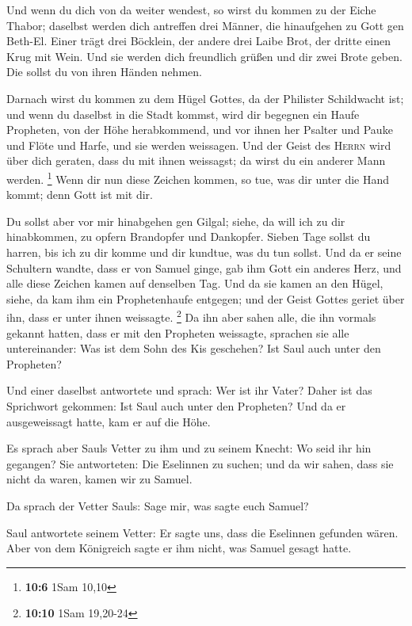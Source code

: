  Und wenn du dich von da weiter wendest, so wirst du
kommen zu der Eiche Thabor; daselbst werden dich antreffen drei Männer,
die hinaufgehen zu Gott gen Beth-El. Einer trägt drei Böcklein, der
andere drei Laibe Brot, der dritte einen Krug mit Wein. 
Und sie werden dich freundlich grüßen und dir zwei Brote geben. Die
sollst du von ihren Händen nehmen.

 Darnach wirst du kommen zu dem Hügel Gottes, da der
Philister Schildwacht ist; und wenn du daselbst in die Stadt kommst,
wird dir begegnen ein Haufe Propheten, von der Höhe herabkommend, und
vor ihnen her Psalter und Pauke und Flöte und Harfe, und sie werden
weissagen.  Und der Geist des \textsc{Herrn} wird über
dich geraten, dass du mit ihnen weissagst; da wirst du ein anderer Mann
werden. \footnote{\textbf{10:6} 1Sam 10,10}  Wenn dir nun
diese Zeichen kommen, so tue, was dir unter die Hand kommt; denn Gott
ist mit dir.

 Du sollst aber vor mir hinabgehen gen Gilgal; siehe, da
will ich zu dir hinabkommen, zu opfern Brandopfer und Dankopfer. Sieben
Tage sollst du harren, bis ich zu dir komme und dir kundtue, was du tun
sollst.  Und da er seine Schultern wandte, dass er von
Samuel ginge, gab ihm Gott ein anderes Herz, und alle diese Zeichen
kamen auf denselben Tag.  Und da sie kamen an den Hügel,
siehe, da kam ihm ein Prophetenhaufe entgegen; und der Geist Gottes
geriet über ihn, dass er unter ihnen weissagte. \footnote{\textbf{10:10}
  1Sam 19,20-24}  Da ihn aber sahen alle, die ihn vormals
gekannt hatten, dass er mit den Propheten weissagte, sprachen sie alle
untereinander: Was ist dem Sohn des Kis geschehen? Ist Saul auch unter
den Propheten?

 Und einer daselbst antwortete und sprach: Wer ist ihr
Vater? Daher ist das Sprichwort gekommen: Ist Saul auch unter den
Propheten?  Und da er ausgeweissagt hatte, kam er auf die
Höhe.

 Es sprach aber Sauls Vetter zu ihm und zu seinem Knecht:
Wo seid ihr hin gegangen? Sie antworteten: Die Eselinnen zu suchen; und
da wir sahen, dass sie nicht da waren, kamen wir zu Samuel.

 Da sprach der Vetter Sauls: Sage mir, was sagte euch
Samuel?

 Saul antwortete seinem Vetter: Er sagte uns, dass die
Eselinnen gefunden wären. Aber von dem Königreich sagte er ihm nicht,
was Samuel gesagt hatte.

